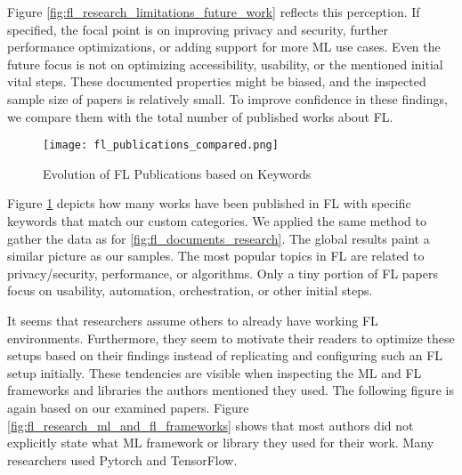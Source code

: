 Figure \ref{fig:fl_research_limitations_future_work} reflects this perception.
If specified, the focal point is on improving privacy and security, further performance optimizations, or adding support for more ML use cases.
Even the future focus is not on optimizing accessibility, usability, or the mentioned initial vital steps.
These documented properties might be biased, and the inspected sample size of papers is relatively small.
To improve confidence in these findings, we compare them with the total number of published works about FL.

\begin{figure}[H]
    \centering
    \texttt{[image: fl\_publications\_compared.png]}
    \caption{Evolution of FL Publications based on Keywords}
    \label{fig:fl_publications_compared}
\end{figure}

Figure \ref{fig:fl_publications_compared} depicts how many works have been published in FL with specific keywords that match our custom categories.
We applied the same method to gather the data as for \ref{fig:fl_documents_research}.
The global results paint a similar picture as our samples.
The most popular topics in FL are related to privacy/security, performance, or algorithms.
Only a tiny portion of FL papers focus on usability, automation, orchestration, or other initial steps.

It seems that researchers assume others to already have working FL environments.
Furthermore, they seem to motivate their readers to optimize these setups based on their findings instead of replicating and configuring such an FL setup initially.
These tendencies are visible when inspecting the ML and FL frameworks and libraries the authors mentioned they used.
The following figure is again based on our examined papers.
Figure \ref{fig:fl_research_ml_and_fl_frameworks} shows that most authors did not explicitly state what ML framework or library they used for their work.
Many researchers used Pytorch and TensorFlow.

